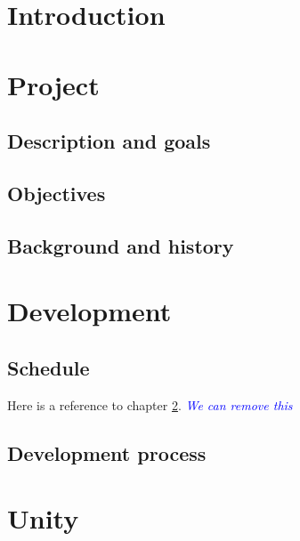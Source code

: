 \documentclass[BSP,english,oneside]{classes/gucthesis}
\newcommand{\comment}[1]{\textcolor{blue}{\emph{#1}}}
\begin{document}


\makefrontpages



\tableofcontents
\listoffigures
\listoftables

\chapter{Introduction}
	\label{chap:introduction}
	

\chapter{Project}
	\label{chap:project}

	\section{Description and goals}
	

	\section{Objectives}
	

	\section{Background and history}
	


\chapter{Development}
	\label{chap:development}

	\section{Schedule}
	
	Here is a reference to chapter \ref{chap:project}. \comment{We can remove this}

	\section{Development process}
	


\chapter{Unity}
	\label{chap:Unity}
	
\end{document}
